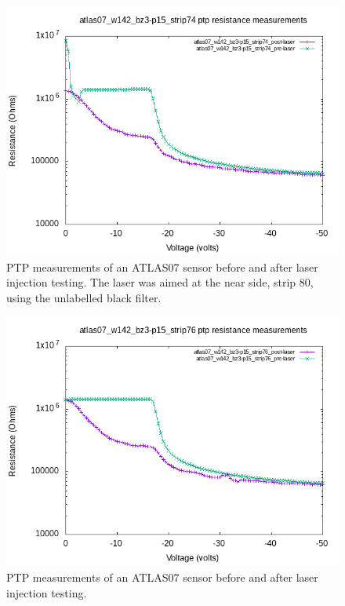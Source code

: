 \documentclass{report}
\begin{document}
            \begin{figure}[h] 
                \includegraphics[height=.4\textheight]{atlas07_w142_bz3-p15_strip74_resistance_plots}
                \centering
                \caption{ PTP measurements of an ATLAS07 sensor before and after laser injection testing. The laser was aimed at the near side, strip 80, using the unlabelled black filter. }
                \label{fig:atlas07_w142_bz3-p15_strip74_resistance_plots}
            \end{figure}

            \begin{figure}[h] 
                \includegraphics[height=.4\textheight]{atlas07_w142_bz3-p15_strip76_resistance_plots}
                \centering
                \caption{ PTP measurements of an ATLAS07 sensor before and after laser injection testing. }
                \label{fig:atlas07_w142_bz3-p15_strip76_resistance_plots}
            \end{figure}
\end{document}
